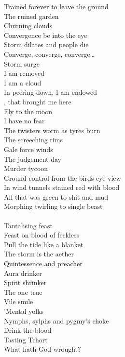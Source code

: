 Trained forever to leave the ground \\
The ruined garden \\
Churning clouds \\
Convergence be into the eye \\
Storm dilates and people die \\

Converge, converge, converge… \\
Storm surge \\

I am removed \\
I am a cloud \\
In peering down, I am endowed \\
, that brought me here \\
Fly to the moon \\
I have no fear \\

The twisters worm as tyres burn \\
The screeching rims \\
Gale force winds \\
The judgement day \\
Murder tycoon \\
Ground control from the birds eye view \\

In wind tunnels stained red with blood \\
All that was green to shit and mud \\

Morphing twirling to single beast \\
 \\
Tantalising feast \\

Feast on blood of feckless \\
Pull the tide like a blanket \\

The storm is the aether \\
Quintessence and preacher \\
Aura drinker \\
Spirit shrinker \\
The one true  \\
Vile smile \\
'Mental yolks \\
Nymphs, sylphs and pygmy's choke \\
Drink the blood \\
Tasting Tchort \\
What hath God wrought? \\

